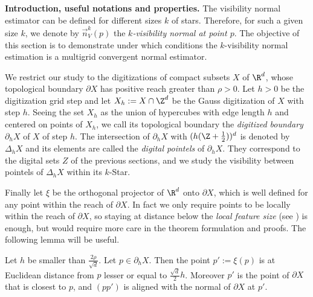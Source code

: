 \newcommand{\CBh}[2]{\ensuremath{\partial_{#1} {#2}}}
\newcommand{\DBh}[2]{\ensuremath{\Delta_{#1} {#2}}}
\newcommand{\DTwo}[2]{\ensuremath{D_{2}\left( #1, #2 \right)}}
\newcommand{\DInf}[2]{\ensuremath{D_{\infty}\left( #1, #2 \right)}}
\newcommand{\TR}[1]{\ensuremath{{#1}^{\mkern-1.5mu\mathsf{T}}}}

\noindent\textbf{Introduction, useful notations and properties.}
The visibility normal estimator can be defined for different sizes $k$
of stars. Therefore, for such a given size $k$, we denote by
$\vec{n}^k_V(p)$ the \emph{$k$-visibility normal at point $p$}.
The objective of this section is to demonstrate under which conditions
the $k$-visibility normal estimation is a multigrid convergent normal
estimator.

We restrict our study to the digitizations of compact subsets $X$ of
$\R^d$, whose topological boundary $\partial X$ has positive reach
greater than $\rho > 0$. Let $h > 0$ be the digitization grid step
and let $X_h := X \cap \Z^d$ be the Gauss digitization of $X$ with
step $h$. Seeing the set $X_h$ as the union of hypercubes with edge
length $h$ and centered on points of $X_h$, we call its topological
boundary the {\em digitized boundary} $\CBh{h}{X}$ of $X$ of step
$h$. The intersection of $\CBh{h}{X}$ with $(h(\Z+\frac{1}{2}))^d$ is
denoted by $\DBh{h}{X}$ and its elements are called the {\em digital
pointels} of $\CBh{h}{X}$. They correspond to the digital sets $Z$
of the previous sections, and we study the visibility between pointels
of $\DBh{h}{X}$ within its $k$-Star.


Finally let $\xi$ be the orthogonal projector of $\R^d$ onto $\partial
X$, which is well defined for any point within the reach of $\partial
X$. In fact we only require points to be locally within the reach of
$\partial X$, so staying at distance below the \emph{local feature
size} (see \cite{amenta:2001-cgta}) is enough, but would require more
care in the theorem formulation and proofs. The following lemma will be useful.

\begin{lemma}{\cite{Lachaud:2016-jmiv}}
    \label{lem-hausdorff-close}
    Let $h$ be smaller than $\frac{2\rho}{\sqrt{d}}$.
    Let $p \in \CBh{h}{X}$. Then the point $p' := \xi(p)$ is at
    Euclidean distance from $p$ lesser or equal to
    $\frac{\sqrt{d}}{2}h$. Moreover $p'$ is the point of $\partial X$
    that is closest to $p$, and $(pp')$ is aligned with the normal of
    $\partial X$ at $p'$.
\end{lemma}

